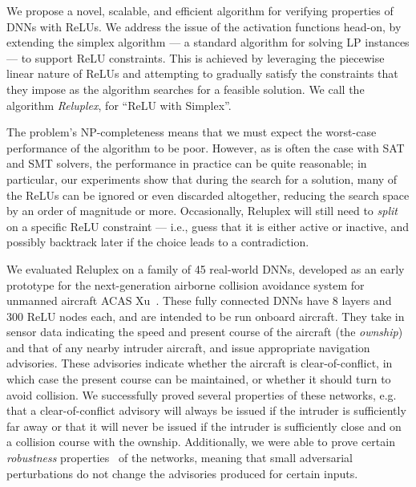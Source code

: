 \documentclass[a4paper]{llncs}
\begin{document}
We propose a novel, scalable, and efficient algorithm for
verifying properties of DNNs with ReLUs.  We address the issue of
the activation functions head-on, by extending the simplex algorithm ---
a standard algorithm for solving LP instances --- to support ReLU
constraints. This is achieved by leveraging the piecewise linear
nature of ReLUs and attempting to 
gradually satisfy the constraints that they impose
as the algorithm searches for a feasible solution.
We call the algorithm \emph{Reluplex}, for ``ReLU with Simplex''.

The problem's NP-completeness means
that we must expect the worst-case performance of the algorithm to be poor.
However, as is often the case with SAT and SMT solvers, the performance in
practice can be quite reasonable; in particular, our experiments
show that during the search for a solution, many of the 
ReLUs can be ignored or even discarded altogether,
reducing the search space by an order of
magnitude or more. Occasionally, Reluplex will still need to \emph{split} on a specific
ReLU constraint --- i.e., guess that it is either active or
inactive, and possibly backtrack later if the choice leads to a
contradiction.

We evaluated Reluplex on a family of 45 real-world DNNs,
developed as an early prototype for the next-generation airborne collision avoidance system
 for unmanned aircraft
ACAS Xu~\cite{JuLoBrOwKo16}. These fully connected DNNs have 8 layers and 300 ReLU
nodes each, and are intended to be run onboard aircraft. They take in sensor data indicating the speed and
present course of the aircraft (the \emph{ownship}) and that of any
nearby intruder aircraft, and issue appropriate navigation
advisories.
 These advisories indicate whether the
aircraft is clear-of-conflict, in which case the present course can be
maintained, or whether it should turn to
 avoid collision. We successfully proved several properties of
 these networks, e.g. that a clear-of-conflict advisory will always be
 issued if the intruder is sufficiently far away or that it will never be
 issued if the intruder is sufficiently close and on a collision
 course with the ownship. 
Additionally, we were able to prove certain \emph{robustness}
properties~\cite{BaIoLaVyNoCr16} of the networks, meaning that small
adversarial perturbations do not change the advisories produced for
certain inputs.
\end{document}
